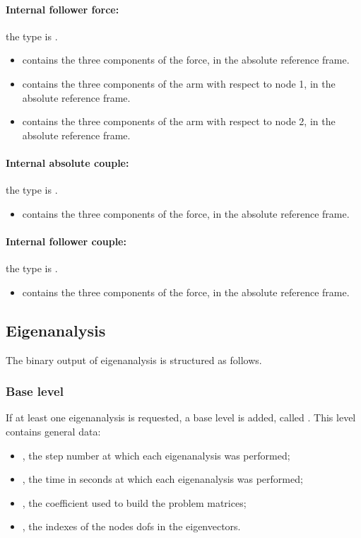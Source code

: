 \paragraph{Internal follower force:}
the type is .
\begin{itemize}
\item {} contains the three components of the force, in the absolute reference frame.
\item {} contains the three components of the arm with respect to node 1, in the absolute reference frame.
\item {} contains the three components of the arm with respect to node 2, in the absolute reference frame.
\end{itemize}

\paragraph{Internal absolute couple:}
the type is .
\begin{itemize}
\item {} contains the three components of the force, in the absolute reference frame.
\end{itemize}

\paragraph{Internal follower couple:}
the type is .
\begin{itemize}
\item {} contains the three components of the force, in the absolute reference frame.
\end{itemize}



\subsection{Eigenanalysis}
\label{sec:NetCDF:Eigen}
The binary output of eigenanalysis is structured as follows.
\subsubsection{Base level}
If at least one eigenanalysis is requested, a base level is added, called .
This level contains general data:
\begin{itemize}
\item {}, the step number at which each eigenanalysis was performed;
\item {}, the time in seconds at which each eigenanalysis was performed;
\item {}, the coefficient used to build the problem matrices;
\item {}, the indexes of the nodes dofs in the eigenvectors.
\end{itemize}

